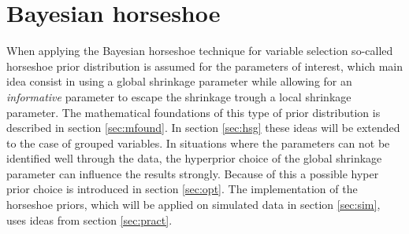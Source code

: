 \documentclass[12pt,letterpaper]{article}
\numberwithin{equation}{subsection}
\begin{document}
\section{Bayesian horseshoe}
When applying the Bayesian horseshoe technique for variable selection so-called horseshoe prior distribution is assumed for the parameters of interest, which main idea consist in using a global shrinkage parameter while allowing for an \textit{informative} parameter to escape the shrinkage trough a local shrinkage parameter. The mathematical foundations of this type of prior distribution is described in section \ref{sec:mfound}. In section \ref{sec:hsg} these ideas will be extended to the case of grouped variables. In situations where the parameters can not be identified well through the data, the hyperprior choice of the global shrinkage parameter can influence the results strongly. Because of this a possible hyper prior choice is introduced in section \ref{sec:opt}. The implementation of the horseshoe priors, which will be applied on simulated data in section \ref{sec:sim}, uses ideas from section \ref{sec:pract}.
\end{document}
